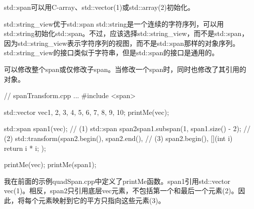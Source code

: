 std::span可以用C-array、std::vector(1)或std::array(2)初始化。



\begin{myTip}{std::string\_view优于std::span}
std::string是一个连续的字符序列，可以用std::string初始化std::span。不过，应该选择std::string\_view，而不是std::span，因为std::string\_view表示字符序列的视图，而不是std::span那样的对象序列。std::string\_view的接口类似于字符串，但是std::span的接口是通用的。
\end{myTip}

可以修改整个span或仅修改子span。当修改一个span时，同时也修改了其引用的对象。


\begin{cpp}
// spanTransform.cpp
...
#include <span>

std::vector vec{1, 2, 3, 4, 5, 6, 7, 8, 9, 10};
printMe(vec);

std::span span1(vec); // (1)
std::span span2{span1.subspan(1, span1.size() - 2)}; // (2)
std::transform(span2.begin(), span2.end(), // (3)
				span2.begin(),
				[](int i){ return i * i; });
				
printMe(vec);
printMe(span1);
\end{cpp}

我在前面的示例quadSpan.cpp中定义了printMe函数。span1引用std::vector vec(1)。相反，span2只引用底层vec元素，不包括第一个和最后一个元素(2)。因此，将每个元素映射到它的平方只指向这些元素(3)。



